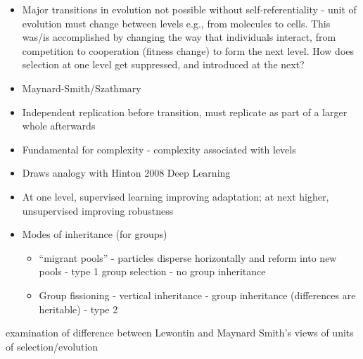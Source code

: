 	\begin{itemize}
		\item
		
		Major transitions in evolution not possible without
		self-referentiality - unit of evolution must change between levels
		e.g., from molecules to cells. This was/is accomplished by changing
		the way that individuals interact, from competition to cooperation
		(fitness change) to form the next level. How does selection at one
		level get suppressed, and introduced at the next?
		
		\item
		
		Maynard-Smith/Szathmary
		
		\item
		
		Independent replication before transition, must replicate as part of
		a larger whole afterwards
		
		\item
		
		Fundamental for complexity - complexity associated with levels
		
		\item
		
		Draws analogy with Hinton 2008 Deep Learning
		
		\item
		
		At one level, supervised learning improving adaptation; at next
		higher, unsupervised improving robustness
		
		\item
		
		Modes of inheritance (for groups)
		
		
		\begin{itemize}
			\item
			
			``migrant pools'' - particles disperse horizontally and reform
			into new pools - type 1 group selection - no group inheritance
			
			\item
			
			Group fissioning - vertical inheritance - group inheritance
			(differences are heritable) - type 2
			
		\end{itemize}
	\end{itemize}


\autocite{Griesemer2001}
	
	examination of difference between Lewontin and Maynard Smith's views
	of units of selection/evolution

